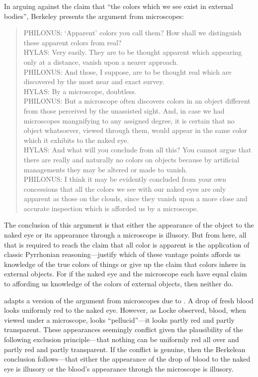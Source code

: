 \documentclass[12pt]{article}
\begin{document}
In arguing against the claim that ``the colors which we see exist in external bodies'', Berkeley presents the argument from microscopes:
\begin{quote}
	PHILONUS: `Apparent' colors you call them? How shall we distinguish these apparent colors from real?\\
	HYLAS: Very easily. They are to be thought apparent which appearing only at a distance, vanish upon a nearer approach.\\
	PHILONUS: And those, I suppose, are to be thought real which are discovered by the most near and exact survey.\\
	HYLAS: By a microscope, doubtless.\\
	PHILONUS: But a microscope often discovers colors in an object different from those perceived by the unassisted sight. And, in case we had microscopes mangnifying to any assigned degree, it is certain that no object whatsoever, viewed through them, would appear in the same color which it exhibits to the naked eye.\\
	HYLAS: And what will you conclude from all this? You cannot argue that there are really and naturally no colors on objects because by artificial managements they may be altered or made to vanish.\\
	PHILONUS: I think it may be evidently concluded from your own concessions that all the colors we see with our naked eyes are only apparent as those on the clouds, since they vanish upon a more close and accurate inspection which is afforded us by a microscope.
\end{quote}
The conclusion of this argument is that either the appearance of the object to the naked eye or its appearance through a microscope is illusory. But from here, all that is required to reach the claim that all color is apparent is the application of classic Pyrrhonian reasoning---justify which of these vantage points affords us knowledge of the true colors of things or give up the claim that colors inhere in external objects. For if the naked eye and the microscope each have equal claim to affording us knowledge of the colors of external objects, then neither do.

\citet{Hilbert:1987jq} adapts a version of the argument from microscopes due to \citet{Marc-Wogau:1968kx}. A drop of fresh blood looks uniformly red to the naked eye. However, as Locke observed, blood, when viewed under a microscope, looks ``pellucid''---it looks partly red and partly transparent. These appearances seemingly conflict given the plausibility of the following exclusion principle---that nothing can be uniformly red all over and partly red and partly transparent. If the conflict is genuine, then the Berkelean conclusion follows---that either the appearance of the drop of blood to the naked eye is illusory or the blood's appearance through the microscope is illusory. 
\end{document}
